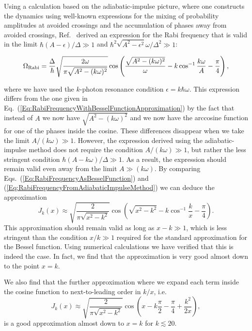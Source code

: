 \documentclass[aps,twocolumn,superscriptaddress]{revtex4}
\begin{document}
Using a calculation based on the adiabatic-impulse picture, where one constructs the dynamics using well-known expressions for the mixing of probability amplitudes at avoided crossings and the accumulation of phases away from avoided crossings, Ref.~\cite{Ashhab2007} derived an expression for the Rabi frequency that is valid in the limit $\hbar(A-\epsilon)/\Delta\gg 1$ and $\hbar^2\sqrt{A^2-\epsilon^2}\omega/\Delta^2\gg 1$:
%
\begin{widetext}
\begin{equation}
\Omega_{\rm Rabi} = \frac{\Delta}{\hbar} \sqrt{\frac{2\omega}{\pi \sqrt{A^2-(k\omega)^2}}} \cos \left( \frac{\sqrt{A^2-(k\omega)^2}}{\omega} - k \cos^{-1}\frac{k\omega}{A} - \frac{\pi}{4}\right),
%
\label{Eq:RabiFrequencyFromAdiabaticImpulseMethod}
\end{equation}
\end{widetext}
%
where we have used the $k$-photon resonance condition $\epsilon=k\hbar\omega$. This expression differs from the one given in Eq.~(\ref{Eq:RabiFrequencyWithBesselFunctionApproximation}) by the fact that instead of $A$ we now have $\sqrt{A^2-(k\omega)^2}$ and we now have the arccosine function for one of the phases inside the cosine. These differences disappear when we take the limit $A/(k\omega)\gg 1$. However, the expression derived using the adiabatic-impulse method does not require the condition $A/(k\omega)\gg 1$, but rather the less stringent condition $\hbar(A-k\omega)/\Delta\gg 1$. As a result, the expression should remain valid even away from the limit $A\gg(k\omega)$. By comparing Eqs.~(\ref{Eq:RabiFrequencyAsBesselFunction}) and (\ref{Eq:RabiFrequencyFromAdiabaticImpulseMethod}) we can deduce the approximation
%
\begin{equation}
J_k(x) \approx \sqrt{\frac{2}{\pi \sqrt{x^2-k^2}}} \cos \left( \sqrt{x^2-k^2} - k \cos^{-1}\frac{k}{x} - \frac{\pi}{4} \right).
\end{equation}
%
This approximation should remain valid as long as $x-k\gg 1$, which is less stringent than the condition $x/k\gg 1$ required for the standard approximation for the Bessel function. Using numerical calculations we have verified that this is indeed the case. In fact, we find that the approximation is very good almost down to the point $x=k$.

We also find that the further approximation where we expand each term inside the cosine function to next-to-leading order in $k/x$, i.e.
%
\begin{equation}
J_k(x) \approx \sqrt{\frac{2}{\pi \sqrt{x^2-k^2}}} \cos \left( x - k \frac{\pi}{2} - \frac{\pi}{4} + \frac{k^2}{2x} \right),
\end{equation}
%
is a good approximation almost down to $x=k$ for $k\lesssim 20$.
\end{document}
